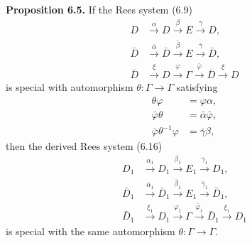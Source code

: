 \textbf{Proposition 6.5.} If the Rees system (6.9)
\begin{align*}
D &\xrightarrow{\alpha} D \xrightarrow{\beta} E \xrightarrow{\gamma} D, \\
\bar{D} &\xrightarrow{\bar{\alpha}} \bar{D} \xrightarrow{\bar{\beta}} E \xrightarrow{\bar{\gamma}} \bar{D}, \\
\bar{D} &\xrightarrow{\xi} D \xrightarrow{\varphi} \Gamma \xrightarrow{\bar{\varphi}} \bar{D} \xrightarrow{\xi} D
\end{align*}
is special with automorphism $\theta : \Gamma \to \Gamma$ satisfying
\begin{align*}
\theta \varphi &= \varphi \alpha, \\
\bar{\varphi} \theta &= \bar{\alpha} \bar{\varphi}, \\
\bar{\varphi} \theta^{-1} \varphi &= \bar{\gamma} \beta,
\end{align*}
then the derived Rees system (6.16)
\begin{align*}
D_1 &\xrightarrow{\alpha_1} D_1 \xrightarrow{\beta_1} E_1 \xrightarrow{\gamma_1} D_1, \\
\bar{D}_1 &\xrightarrow{\bar{\alpha}_1} \bar{D}_1 \xrightarrow{\bar{\beta}_1} E_1 \xrightarrow{\bar{\gamma}_1} \bar{D}_1, \\
\bar{D}_1 &\xrightarrow{\xi_1} D_1 \xrightarrow{\varphi_1} \Gamma \xrightarrow{\bar{\varphi}_1} \bar{D}_1 \xrightarrow{\xi_1} D_1
\end{align*}
is special with the same automorphism $\theta : \Gamma \to \Gamma$.
